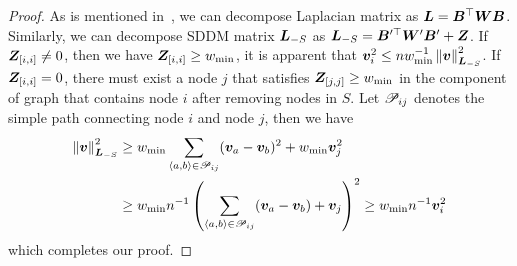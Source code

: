 \documentclass[sigconf]{acmart}
\begin{document}
\begin{proof}
    As is mentioned in~, we can decompose Laplacian matrix as \(\boldsymbol{L}=\boldsymbol{B}^\top\boldsymbol{W}\boldsymbol{B}\).
    Similarly, we can decompose SDDM matrix \(\boldsymbol{L}_{-S}\) as \(\boldsymbol{L}_{-S}=\boldsymbol{B}'^\top\boldsymbol{W}'\boldsymbol{B}'+\boldsymbol{Z}\).
    If \(\boldsymbol{Z}_{[i,i]}\neq0\), then we have \(\boldsymbol{Z}_{[i,i]}\ge w_{\min}\), it is apparent that \(\boldsymbol{v}_i^2\le nw_{\min}^{-1}\left\Vert\boldsymbol{v}\right\Vert^2_{\boldsymbol{L}_{-S}}\).
    If \(\boldsymbol{Z}_{[i,i]}=0\), there must exist a node \(j\) that satisfies \(\boldsymbol{Z}_{[j,j]}\ge w_{\min}\) in the component of graph that contains node \(i\) after removing nodes in \(S\).
    Let \(\mathscr{P}_{ij}\) denotes the simple path connecting node \(i\) and node \(j\), then we have
    \begin{align*}
        \left\Vert\boldsymbol{v}\right\Vert^2_{\boldsymbol{L}_{-S}}
         & \ge w_{\min}\sum_{\langle a, b \rangle\in\mathscr{P}_{ij}}(\boldsymbol{v}_a-\boldsymbol{v}_b)^2+w_{\min}\boldsymbol{v}_j^2     \\
         & \ge w_{\min}n^{-1}\left( \sum_{\langle a, b \rangle\in\mathscr{P}_{ij}}(\boldsymbol{v}_a-\boldsymbol{v}_b)+\boldsymbol{v}_j \right)^2
        \ge w_{\min}n^{-1}\boldsymbol{v}_i^2
    \end{align*}
    which completes our proof.
\end{proof}
\end{document}
